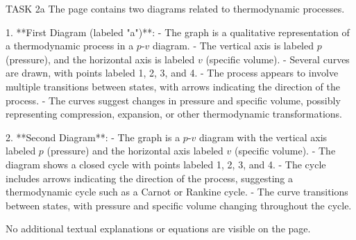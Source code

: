 TASK 2a  
The page contains two diagrams related to thermodynamic processes.  

1. **First Diagram (labeled "a")**:  
   - The graph is a qualitative representation of a thermodynamic process in a \( p \)-\( v \) diagram.  
   - The vertical axis is labeled \( p \) (pressure), and the horizontal axis is labeled \( v \) (specific volume).  
   - Several curves are drawn, with points labeled 1, 2, 3, and 4.  
   - The process appears to involve multiple transitions between states, with arrows indicating the direction of the process.  
   - The curves suggest changes in pressure and specific volume, possibly representing compression, expansion, or other thermodynamic transformations.  

2. **Second Diagram**:  
   - The graph is a \( p \)-\( v \) diagram with the vertical axis labeled \( p \) (pressure) and the horizontal axis labeled \( v \) (specific volume).  
   - The diagram shows a closed cycle with points labeled 1, 2, 3, and 4.  
   - The cycle includes arrows indicating the direction of the process, suggesting a thermodynamic cycle such as a Carnot or Rankine cycle.  
   - The curve transitions between states, with pressure and specific volume changing throughout the cycle.  

No additional textual explanations or equations are visible on the page.